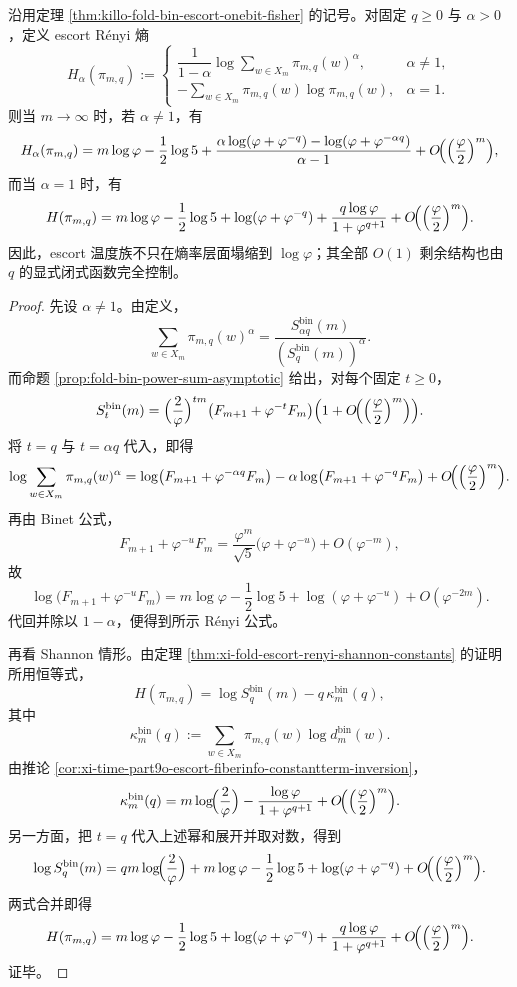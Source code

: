\begin{theorem}\label{thm:xi-time-part65h-escort-renyi-o1-temperature-profile}
沿用定理 \ref{thm:killo-fold-bin-escort-onebit-fisher} 的记号。对固定 \(q\ge 0\) 与 \(\alpha>0\)，定义 escort Rényi 熵
\[
H_{\alpha}(\pi_{m,q})
:=
\begin{cases}
\dfrac{1}{1-\alpha}\log\sum_{w\in X_m}\pi_{m,q}(w)^\alpha,
& \alpha\neq 1,\\[2mm]
-\sum_{w\in X_m}\pi_{m,q}(w)\log\pi_{m,q}(w),
& \alpha=1.
\end{cases}
\]
则当 \(m\to\infty\) 时，若 \(\alpha\neq 1\)，有
\[
H_{\alpha}(\pi_{m,q})
=
m\log\varphi
-\frac12\log 5
+
\frac{\alpha\log(\varphi+\varphi^{-q})-\log(\varphi+\varphi^{-\alpha q})}{\alpha-1}
+O\!\Bigl(\Bigl(\frac{\varphi}{2}\Bigr)^m\Bigr),
\]
而当 \(\alpha=1\) 时，有
\[
H(\pi_{m,q})
=
m\log\varphi
-\frac12\log 5
+\log(\varphi+\varphi^{-q})
+\frac{q\log\varphi}{1+\varphi^{q+1}}
+O\!\Bigl(\Bigl(\frac{\varphi}{2}\Bigr)^m\Bigr).
\]
因此，escort 温度族不只在熵率层面塌缩到 \(\log\varphi\)；其全部 \(O(1)\) 剩余结构也由 \(q\) 的显式闭式函数完全控制。
\end{theorem}
\begin{proof}
先设 \(\alpha\neq 1\)。由定义，
\[
\sum_{w\in X_m}\pi_{m,q}(w)^\alpha
=
\frac{S_{\alpha q}^{\mathrm{bin}}(m)}{(S_q^{\mathrm{bin}}(m))^\alpha}.
\]
而命题 \ref{prop:fold-bin-power-sum-asymptotic} 给出，对每个固定 \(t\ge 0\)，
\[
S_t^{\mathrm{bin}}(m)
=
\Bigl(\frac{2}{\varphi}\Bigr)^{tm}
\bigl(F_{m+1}+\varphi^{-t}F_m\bigr)
\Bigl(1+O\!\Bigl(\Bigl(\frac{\varphi}{2}\Bigr)^m\Bigr)\Bigr).
\]
将 \(t=q\) 与 \(t=\alpha q\) 代入，即得
\[
\log\sum_{w\in X_m}\pi_{m,q}(w)^\alpha
=
\log\bigl(F_{m+1}+\varphi^{-\alpha q}F_m\bigr)
-\alpha\log\bigl(F_{m+1}+\varphi^{-q}F_m\bigr)
+O\!\Bigl(\Bigl(\frac{\varphi}{2}\Bigr)^m\Bigr).
\]
再由 Binet 公式，
\[
F_{m+1}+\varphi^{-u}F_m
=
\frac{\varphi^m}{\sqrt5}\bigl(\varphi+\varphi^{-u}\bigr)+O(\varphi^{-m}),
\]
故
\[
\log\bigl(F_{m+1}+\varphi^{-u}F_m\bigr)
=
m\log\varphi-\frac12\log5+\log(\varphi+\varphi^{-u})
+O(\varphi^{-2m}).
\]
代回并除以 \(1-\alpha\)，便得到所示 Rényi 公式。

再看 Shannon 情形。由定理 \ref{thm:xi-fold-escort-renyi-shannon-constants} 的证明所用恒等式，
\[
H(\pi_{m,q})
=
\log S_q^{\mathrm{bin}}(m)-q\,\kappa_m^{\mathrm{bin}}(q),
\]
其中
\[
\kappa_m^{\mathrm{bin}}(q):=
\sum_{w\in X_m}\pi_{m,q}(w)\log d_m^{\mathrm{bin}}(w).
\]
由推论 \ref{cor:xi-time-part9o-escort-fiberinfo-constantterm-inversion}，
\[
\kappa_m^{\mathrm{bin}}(q)
=
m\log\!\Bigl(\frac{2}{\varphi}\Bigr)
-\frac{\log\varphi}{1+\varphi^{q+1}}
+O\!\Bigl(\Bigl(\frac{\varphi}{2}\Bigr)^m\Bigr).
\]
另一方面，把 \(t=q\) 代入上述幂和展开并取对数，得到
\[
\log S_q^{\mathrm{bin}}(m)
=
qm\log\!\Bigl(\frac{2}{\varphi}\Bigr)
+m\log\varphi
-\frac12\log5
+\log(\varphi+\varphi^{-q})
+O\!\Bigl(\Bigl(\frac{\varphi}{2}\Bigr)^m\Bigr).
\]
两式合并即得
\[
H(\pi_{m,q})
=
m\log\varphi
-\frac12\log5
+\log(\varphi+\varphi^{-q})
+\frac{q\log\varphi}{1+\varphi^{q+1}}
+O\!\Bigl(\Bigl(\frac{\varphi}{2}\Bigr)^m\Bigr).
\]
证毕。
\end{proof}


